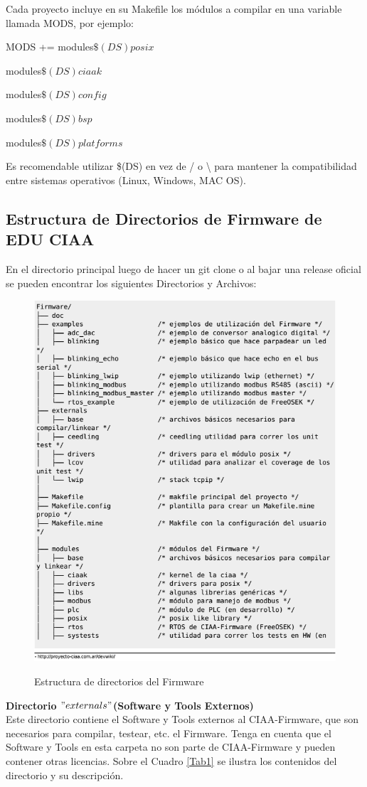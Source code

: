 \documentclass[12pt,letterpaper]{article}
\begin{document}
Cada proyecto incluye en su Makefile los módulos a compilar en una variable llamada MODS, por ejemplo:

MODS += modules$\$(DS)posix$ \  

        modules$\$(DS)ciaak $\  
        
        modules$\$(DS)config$ \  
        
        modules$\$(DS)bsp $\	
        
        modules$\$(DS)platforms$

Es recomendable utilizar \$(DS) en vez de / o \textbackslash{} para mantener la compatibilidad entre sistemas operativos (Linux, Windows, MAC OS).
{
\subsection{Estructura de Directorios de Firmware de EDU CIAA}
En el directorio principal luego de hacer un git clone o al bajar una release oficial se pueden encontrar los siguientes Directorios y Archivos\cite{estructuradedirectorios}:


\begin{figure}[!h]
\centering
\includegraphics[width=8 cm]{figuras/est_directorios_ciaa.png}\\
\caption{Estructura de directorios del Firmware}
\label{Fig3}
\end{figure}

\textbf{Directorio $"externals"$(Software y Tools Externos)}\\
Este directorio contiene el Software y Tools externos al CIAA-Firmware, que son necesarios para compilar, testear, etc. el Firmware. Tenga en cuenta que el Software y Tools en esta carpeta no son parte de CIAA-Firmware y pueden contener otras licencias. Sobre el Cuadro \ref{Tab1} se ilustra los contenidos del directorio y su descripción.

}
\end{document}
